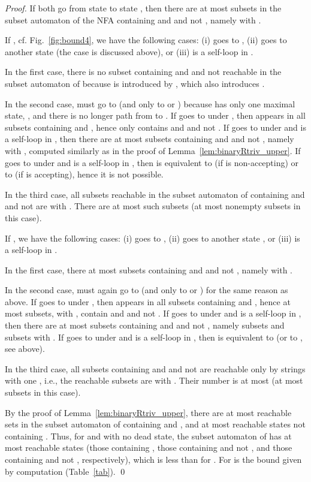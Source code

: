 \documentclass[runningheads]{llncs}
\begin{document}
\begin{proof}
    If both  go from state  to state ,
    then there are at most  subsets in the subset automaton of the NFA  containing  and  and not ,
    namely  with .
    
    If , cf. Fig.~\ref{fig:bound4}, we have the following cases:
    (i)  goes to ,
    (ii)  goes to another state  (the case  is discussed above), or
    (iii)  is a self-loop in .

    In the first case, there is no subset containing  and  and not  reachable in the subset automaton of  
    because  is introduced by , which also introduces .

    In the second case, 
     must go to  (and only to  or ) 
    because  has only one maximal state, , and there is no longer path from  to .
    If  goes to  under ,
    then  appears in all subsets containing  and , 
    hence only  contains  and  and not .
    If  goes to  under  and  is a self-loop in ,
    then there are at most  subsets containing  and  and not , namely  with ,
    computed similarly as in the proof of Lemma~\ref{lem:binaryRtriv_upper}.
    If  goes to  under  and  is a self-loop in , then  is equivalent to  (if  is non-accepting) or to  (if  is accepting), hence it is not possible.


    In the third case,
    all subsets reachable in the subset automaton of  containing  and  and not  are  with . There are at most  such subsets (at most  nonempty subsets  in this case).


    If , we have the following cases:
    (i)  goes to ,
    (ii)  goes to another state , or
    (iii)  is a self-loop in .

    In the first case, there at most  subsets containing  and  and not , namely  with .

    In the second case,
     must again go to  (and only to  or ) for the same reason as above.
    If  goes to  under ,
    then  appears in all subsets containing  and , 
    hence at most  subsets,  with , contain  and  and not .
    If  goes to  under  and  is a self-loop in ,
    then there are at most  subsets containing  and  and not ,
    namely  subsets  and  subsets  with .
    If  goes to  under  and  is a self-loop in ,
    then  is equivalent to  (or to , see above).


    In the third case, all subsets containing  and  and not  are reachable only by strings with one , i.e., the reachable subsets are  with . Their number is at most  (at most  subsets  in this case).


    By the proof of Lemma~\ref{lem:binaryRtriv_upper}, there are at most  reachable sets in the subset automaton of  containing  and , and at most  reachable states not containing . Thus, for  and  with no dead state, the subset automaton of  has at most  reachable states (those containing , those containing  and not , and those containing  and not , respectively),
    which is less than  for .
    For  is the bound given by computation (Table~\ref{tab}).
  \qed
  \end{proof}
\end{document}
